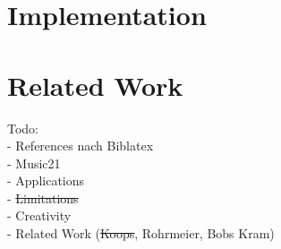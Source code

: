 \documentclass[a4paper,11pt, fleqn]{article}
\date{\today}
\author{Thats Me}
\begin{document}

\tableofcontents 

\clearpage


\clearpage
\section{Implementation}









\clearpage
\section{Related Work}



\clearpage


\clearpage
\noindent
Todo:\\
- References nach Biblatex\\
- Music21\\
- Applications\\
- \sout{Limitations}\\
- Creativity\\
- Related Work (\sout{Koops}, Rohrmeier, Bobs Kram)

%

\printbibliography
\end{document}
